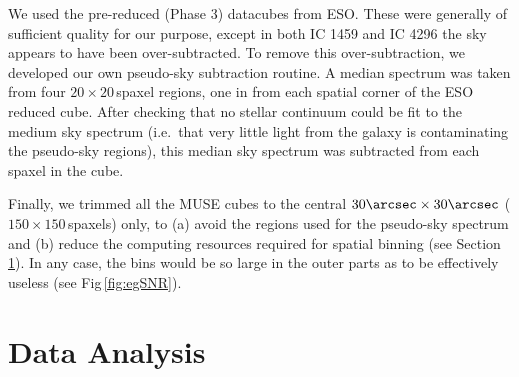\documentclass[fleqn,usenatbib,useAMS]{mnras}
\begin{document}
		We used the pre-reduced (Phase 3) datacubes from ESO. These were generally of sufficient quality for our purpose, except in both IC 1459 and IC 4296 the sky appears to have been over-subtracted. To remove this over-subtraction, we developed our own pseudo-sky subtraction routine. A median spectrum was taken from four $20 \times 20$\,spaxel regions, one in from each spatial corner of the ESO reduced cube. After checking that no stellar continuum could be fit to the medium sky spectrum (i.e.\ that very little light from the galaxy is contaminating the pseudo-sky regions), this median sky spectrum was subtracted from each spaxel in the cube. 

		Finally, we trimmed all the MUSE cubes to the central $30\arcsec \times 30\arcsec$ ($150 \times 150$\,spaxels) only, to (a) avoid the regions used for the pseudo-sky spectrum and (b) reduce the computing resources required for spatial binning (see Section \ref{sec:analysis}). In any case, the bins would be so large in the outer parts as to be effectively useless (see Fig\,\ref{fig:egSNR}).


\section{Data Analysis}
	\label{sec:analysis}


\end{document}
